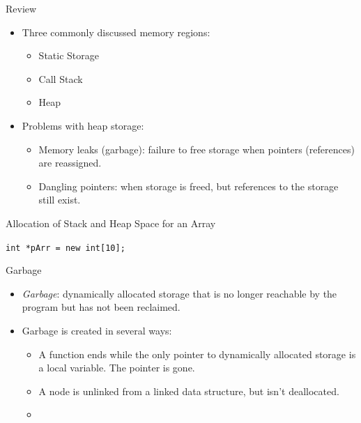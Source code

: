 \documentclass[14pt,aspectratio=1610]{beamer}
\begin{document}
\begin{frame}{Review}

\begin{itemize}[<+->]
\item
  Three commonly discussed memory regions:
  \begin{itemize}
  \item
    Static Storage
  \item
    Call Stack
  \item
    Heap
  \end{itemize}
\item
  Problems with heap storage:
  \begin{itemize}
  \item
    Memory leaks (garbage): failure to free storage when pointers
    (references) are reassigned.
  \item
    Dangling pointers: when storage is freed, but references to the
    storage still exist.
  \end{itemize}
\end{itemize}
\end{frame}

\begin{frame}{Allocation of Stack and Heap Space for an Array}
\begin{center}
  \lstinline{int *pArr = new int[10];}\\\vspace{1em}

\end{center}
\end{frame}

\begin{frame}{Garbage}

\begin{itemize}
\item
  \emph{Garbage}: dynamically allocated storage that is no longer reachable by
  the program but has not been reclaimed.
\item
  Garbage is created in several ways:
  \begin{itemize}
  \item
    A function ends while the only pointer to dynamically allocated storage is
    a local variable. The pointer is gone.
  \item
    A node is unlinked from a linked data structure, but isn't deallocated.
  \item
    \textellipsis{}
  \end{itemize}
\end{itemize}
\end{frame}
\end{document}
